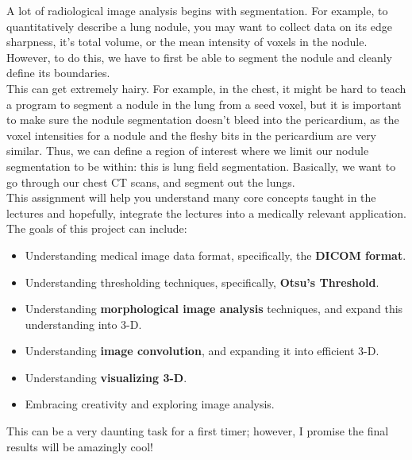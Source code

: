 \documentclass[10pt]{article}
\begin{document}
\indent A lot of radiological image analysis begins with segmentation.  For example, to quantitatively describe a lung nodule, you may want to collect data on its edge sharpness, it's total volume, or the mean intensity of voxels in the nodule.  However, to do this, we have to first be able to segment the nodule and cleanly define its boundaries.\\
\indent This can get extremely hairy.  For example, in the chest, it might be hard to teach a program to segment a nodule in the lung from a seed voxel, but it is important to make sure the nodule segmentation doesn't bleed into the pericardium, as the voxel intensities for a nodule and the fleshy bits in the pericardium are very similar.  Thus, we can define a region of interest where we limit our nodule segmentation to be within: this is lung field segmentation.  Basically, we want to go through our chest CT scans, and segment out the lungs.\\
\indent This assignment will help you understand many core concepts taught in the lectures and hopefully, integrate the lectures into a medically relevant application.  The goals of this project can include:
\begin{itemize}[noitemsep]
\item Understanding medical image data format, specifically, the \textbf{DICOM format}.
\item Understanding thresholding techniques, specifically, \textbf{Otsu's Threshold}.
\item Understanding \textbf{morphological image analysis} techniques, and expand this understanding into 3-D.
\item Understanding \textbf{image convolution}, and expanding it into efficient 3-D.
\item Understanding \textbf{visualizing 3-D}.
\item Embracing creativity and exploring image analysis.
\end{itemize}
\indent This can be a very daunting task for a first timer; however, I promise the final results will be amazingly cool!\\
\ \\
\end{document}
